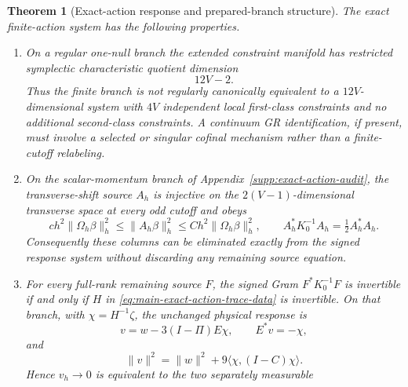\documentclass[11pt]{article}
\newtheorem{theorem}{Theorem}[section]
\theoremstyle{definition}
\theoremstyle{remark}
\begin{document}
\begin{theorem}[Exact-action response and prepared-branch structure]
\label{thm:main-exact-action-response}
The exact finite-action system has the following properties.
\begin{enumerate}[label=\textup{(X\arabic*)},leftmargin=3em]
\item On a regular one-null branch the extended constraint manifold has
      restricted symplectic characteristic quotient dimension
      \begin{equation}
       \boxed{12V-2.}
       \label{eq:main-exact-action-quotient}
      \end{equation}
      Thus the finite branch is not regularly canonically equivalent to a
      $12V$-dimensional system with $4V$ independent local first-class
      constraints and no additional second-class constraints.  A continuum
      GR identification, if present, must involve a selected or singular
      cofinal mechanism rather than a finite-cutoff relabeling.
\item On the scalar-momentum branch of Appendix~\ref{supp:exact-action-audit},
      the transverse-shift source $A_h$ is injective on the
      $2(V-1)$-dimensional transverse space at every odd cutoff and obeys
      \begin{equation}
       c h^2\|\Omega_h\beta\|_h^2
       \le\|A_h\beta\|_h^2
       \le C h^2\|\Omega_h\beta\|_h^2,
       \qquad
       A_h^*K_0^{-1}A_h=\tfrac12A_h^*A_h.
       \label{eq:main-exact-action-transverse}
      \end{equation}
      Consequently these columns can be eliminated exactly from the signed
      response system without discarding any remaining source equation.
\item For every full-rank remaining source $F$, the signed Gram
      $F^*K_0^{-1}F$ is invertible if and only if $H$ in
      \eqref{eq:main-exact-action-trace-data} is invertible.  On that branch,
      with $\chi=H^{-1}\zeta$, the unchanged physical response is
      \begin{equation}
       \boxed{v=w-3(I-\Pi)E\chi,\qquad E^*v=-\chi,}
       \label{eq:main-exact-action-scalar-response}
      \end{equation}
      and
      \begin{equation}
       \boxed{\|v\|^2=\|w\|^2+9\langle\chi,(I-C)\chi\rangle.}
       \label{eq:main-exact-action-scalar-energy}
      \end{equation}
      Hence $v_h\to0$ is equivalent to the two separately measurable

\end{enumerate}
\end{theorem}
\end{document}
